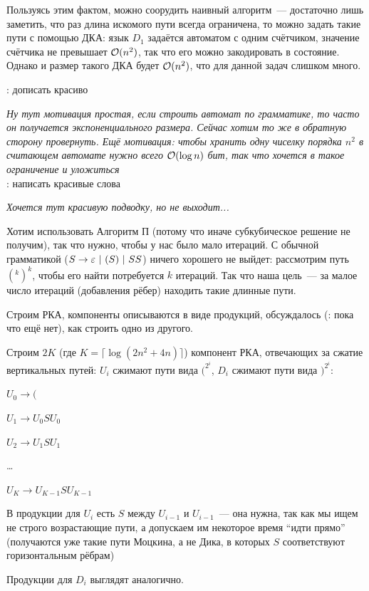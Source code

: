 \begin{note}
Пользуясь этим фактом, можно соорудить наивный алгоритм~--- достаточно лишь заметить, что раз длина искомого пути всегда ограничена, то можно задать такие пути с помощью ДКА: язык $D_1$ задаётся автоматом с одним счётчиком, значение счётчика не превышает $\mathcal{O}(n^2)$, так что его можно закодировать в состояние. Однако и размер такого ДКА будет $\mathcal{O}(n^2)$, что для данной задач слишком много.
\end{note} 

\TODO: дописать красиво

\textit{Ну тут мотивация простая, если строить автомат по грамматике, то часто он получается экспоненциального размера. Сейчас хотим то же в обратную сторону провернуть. Ещё мотивация: чтобы хранить одну чиселку порядка $n^2$ в считающем автомате нужно всего $\mathcal{O}(\log n)$ бит, так что хочется в такое ограничение и уложиться}\\
\TODO: написать красивые слова

\textit{Хочется тут красивую подводку, но не выходит...}

Хотим использовать Алгоритм П (потому что иначе субкубическое решение не получим), так что нужно, чтобы у нас было мало итераций. С обычной грамматикой ($S \rightarrow \varepsilon~|~(S)~|~SS$) ничего хорошего не выйдет: рассмотрим путь $(^k )^k$, чтобы его найти потребуется $k$ итераций. Так что наша цель~--- за малое число итераций (добавления рёбер) находить такие длинные пути.

Строим РКА, компоненты описываются в виде продукций, обсуждалось (\TODO: пока что ещё нет), как строить одно из другого.

Строим $2K$ (где $K = \lceil \log (2 n^2 + 4n) \rceil$) компонент РКА, отвечающих за сжатие вертикальных путей: $U_i$ сжимают пути вида $(^{2^i}$, $D_i$ сжимают пути вида $)^{2^i}$:

$U_0 \to ($

$U_1 \to U_0 S U_0$

$U_2 \to U_1 S U_1$

\dots

$U_K \to U_{K-1} S U_{K-1}$ 

В продукции для $U_i$ есть $S$ между $U_{i-1}$ и $U_{i-1}$~--- она нужна, так как мы ищем не строго возрастающие пути, а допускаем им некоторое время ``идти прямо'' (получаются уже такие пути Моцкина, а не Дика, в которых $S$ соответствуют горизонтальным рёбрам)

Продукции для $D_i$ выглядят аналогично.


